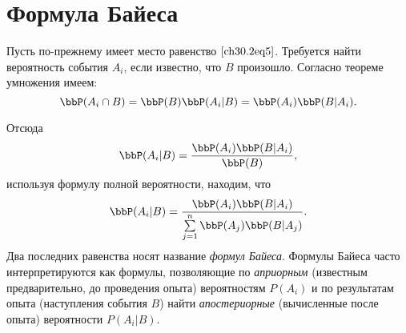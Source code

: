 \section{Формула Байеса}
Пусть по-прежнему имеет место равенство $\eqref{ch30.2eq5}$. Требуется найти вероятность события $A_i$, если известно, что $B$ произошло. Согласно теореме умножения имеем:
$$
\bbP(A_i\cap B) = \bbP(B)\bbP(A_i|B) = \bbP(A_i)\bbP(B|A_i).
$$

Отсюда
$$
\bbP(A_i|B) = \frac{\bbP(A_i)\bbP(B|A_i)}{\bbP(B)},
$$
используя формулу полной вероятности, находим, что
$$
\bbP(A_i|B) = \frac{\bbP(A_i)\bbP(B|A_i)}{\sum\limits_{j = 1}^{n} \bbP(A_j)\bbP(B|A_j)}.
$$
Два последних равенства носят название \textit{формул Байеса}. Формулы Байеса часто интерпретируются как формулы, позволяющие по \textit{априорным} (известным предварительно, до проведения опыта) вероятностям $P(A_i)$ и по результатам опыта (наступления события $B$) найти \textit{апостериорные} (вычисленные после опыта) вероятности $P(A_i|B)$.

